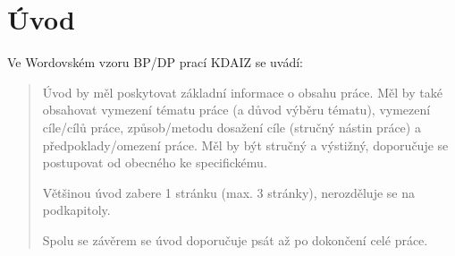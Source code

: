 \chapter*{Úvod}
\label{sec:uvod}

Ve Wordovském vzoru BP/DP prací KDAIZ se uvádí:
\begin{quote}
    Úvod by měl poskytovat základní informace o obsahu práce. Měl by také obsahovat vymezení tématu práce (a důvod výběru tématu), vymezení cíle/cílů práce, způsob/metodu dosažení cíle (stručný nástin práce) a předpoklady/omezení práce. Měl by být stručný a výstižný, doporučuje se postupovat od obecného ke specifickému.

    Většinou úvod zabere 1 stránku (max. 3 stránky), nerozděluje se na podkapitoly.

    Spolu se závěrem se úvod doporučuje psát až po dokončení celé práce.
\end{quote}

